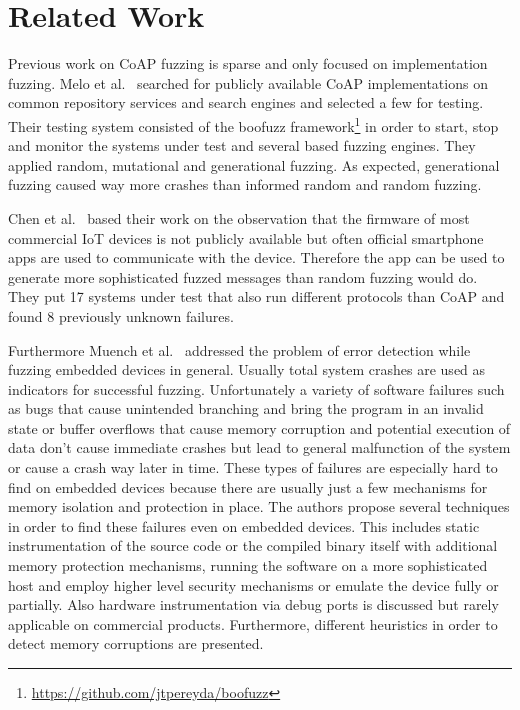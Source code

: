 \section{Related Work}
\label{section:related_work}


Previous work on CoAP fuzzing is sparse and only focused on implementation fuzzing. Melo et al.~\cite{Melo2017RobustnessTO} searched for publicly available CoAP implementations on common repository services and search engines and selected a few for testing. Their testing system consisted of the boofuzz framework\footnote{\url{https://github.com/jtpereyda/boofuzz}} in order to start, stop and monitor the systems under test and several \scapy based fuzzing engines. They applied random, mutational and generational fuzzing. As expected, generational fuzzing caused way more crashes than informed random and random fuzzing.

Chen et al.~\cite{chen2018ndss} based their work on the observation that the firmware of most commercial IoT devices is not publicly available but often official smartphone apps are used to communicate with the device. Therefore the app can be used to generate more sophisticated fuzzed messages than random fuzzing would do. They put 17 systems under test that also run different protocols than CoAP and found 8 previously unknown failures.

Furthermore Muench et al.~\cite{EURECOM+5417} addressed the problem of error detection while fuzzing embedded devices in general. Usually total system crashes are used as indicators for successful fuzzing. Unfortunately a variety of software failures such as bugs that cause unintended branching and bring the program in an invalid state or buffer overflows that cause memory corruption and potential execution of data don't cause immediate crashes but lead to general malfunction of the system or cause a crash way later in time. These types of failures are especially hard to find on embedded devices because there are usually just a few mechanisms for memory isolation and protection in place. The authors propose several techniques in order to find these failures even on embedded devices. This includes static instrumentation of the source code or the compiled binary itself with additional memory protection mechanisms, running the software on a more sophisticated host and employ higher level security mechanisms or emulate the device fully or partially. Also hardware instrumentation via debug ports is discussed but rarely applicable on commercial products. Furthermore, different heuristics in order to detect memory corruptions are presented.

